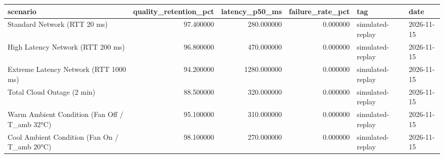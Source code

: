 \begin{tabular}{lrrrll}
\toprule
scenario & quality_retention_pct & latency_p50_ms & failure_rate_pct & tag & date \\
\midrule
Standard Network (RTT 20 ms) & 97.400000 & 280.000000 & 0.000000 & simulated-replay & 2026-11-15 \\
High Latency Network (RTT 200 ms) & 96.800000 & 470.000000 & 0.000000 & simulated-replay & 2026-11-15 \\
Extreme Latency Network (RTT 1000 ms) & 94.200000 & 1280.000000 & 0.000000 & simulated-replay & 2026-11-15 \\
Total Cloud Outage (2 min) & 88.500000 & 320.000000 & 0.000000 & simulated-replay & 2026-11-15 \\
Warm Ambient Condition (Fan Off / T_amb 32°C) & 95.100000 & 310.000000 & 0.000000 & simulated-replay & 2026-11-15 \\
Cool Ambient Condition (Fan On / T_amb 20°C) & 98.100000 & 270.000000 & 0.000000 & simulated-replay & 2026-11-15 \\
\bottomrule
\end{tabular}
